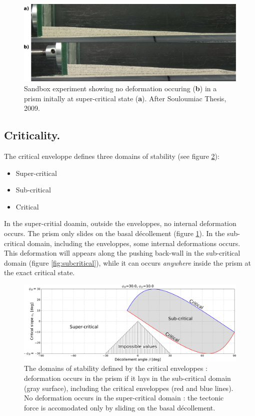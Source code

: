 \documentclass[a4paper]{scrartcl}
\begin{document}
\begin{figure}[p]
	\includegraphics[width=15cm]{Sandbox-supercritical.pdf} 	
	\caption{Sandbox experiment showing no deformation occuring (\textbf{b}) in a prism initally at super-critical state (\textbf{a}). After Souloumiac Thesis, 2009.}
	\label{fig:supercritical}
\end{figure}

\subsection{Criticality.}

The critical enveloppe defines three domains of stability (see figure \ref{fig:domains}):
\begin{itemize}
	\item Super-critical
	\item Sub-critical
	\item Critical
\end{itemize}
In the super-critial doamin, outside the enveloppes, no internal deformation occurs.
The prism only slides on the basal décollement (figure \ref{fig:supercritical}).
In the sub-critical domain, including the enveloppes, some internal deformations occurs.
This deformation will appears along the pushing back-wall in the sub-critical domain (figure \ref{fig:subcritical}), while it can occurs \emph{anywhere} inside the prism at the exact critical state.

\begin{figure}[h]
	\centering
	\includegraphics[width=15cm]{ECCW_domains.pdf}
	\caption{The domains of stability defined by the critical enveloppes : deformation occurs in the prism if it lays in the sub-critical domain (gray surface), including the critical enveloppes (red and blue lines). No deformation occurs in the super-critical domain : the tectonic force is accomodated only by sliding on the basal décollement.}
	\label{fig:domains}
\end{figure}
\end{document}
